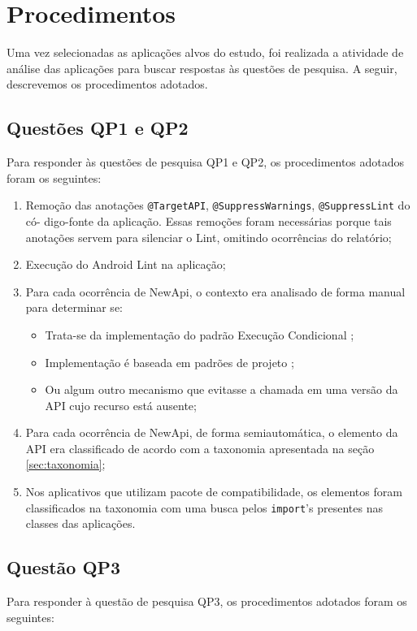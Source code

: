 \section{Procedimentos} \label{sec:procedimentos}

Uma vez selecionadas as aplicações alvos do estudo, foi realizada a atividade de
análise das aplicações para buscar respostas às questões de pesquisa. A seguir,
descrevemos os procedimentos adotados. 

\subsection{Questões QP1 e QP2}
Para responder às questões de pesquisa QP1 e QP2, os procedimentos adotados foram os
seguintes:

\begin{enumerate}
	\item Remoção das anotações \texttt{@TargetAPI}, \texttt{@SuppressWarnings},
	 	\texttt{@SuppressLint} do có- digo-fonte da aplicação. Essas remoções foram
	 	 necessárias porque tais anotações servem para silenciar o Lint, omitindo 
	 	 ocorrências do relatório; 
	\item Execução do Android Lint na aplicação;
	\item Para cada ocorrência de NewApi, o contexto era analisado de forma manual
		para determinar se:
		\begin{itemize}
			\item Trata-se da implementação do padrão Execução Condicional
				\cite{Santos2012};
			\item Implementação é baseada em padrões de projeto \cite{Gamma}; 
			\item Ou algum outro mecanismo que evitasse a chamada em uma versão
			da API cujo recurso está ausente;
		\end{itemize}
	\item Para cada ocorrência de NewApi, de forma semiautomática, o elemento da API
		era classificado de acordo com a taxonomia apresentada na seção \ref{sec:taxonomia};
	\item Nos aplicativos que utilizam pacote de compatibilidade, os elementos foram
		 classificados na taxonomia com uma busca pelos \texttt{import}'s  presentes
		 nas classes das aplicações.
\end{enumerate}

\subsection{Questão QP3}
Para responder à questão de pesquisa QP3, os procedimentos adotados foram os
seguintes:

